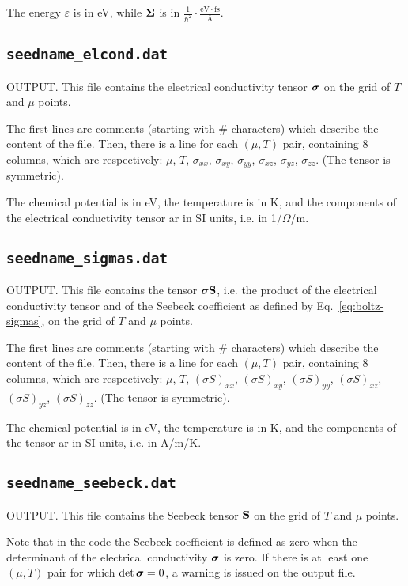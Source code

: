 The energy $\varepsilon$ is in eV, while $\bm{\mathrm{\Sigma}}$ is in 
 $\displaystyle\frac{1}{\hbar^2}\cdot\frac{\mathrm{eV}\cdot\mathrm{fs}}{\text{\AA}}$.

\subsection{{\tt seedname\_elcond.dat}}
OUTPUT. This file contains the electrical conductivity tensor $\bm{\mathrm{\sigma}}$ on the grid of $T$ and $\mu$ points. 

The first lines are comments (starting with \# characters) which describe the content of the file.
Then, there is a line for each $(\mu,T)$ pair, containing 8 columns, which are respectively: $\mu$, $T$, $\sigma_{xx}$, $\sigma_{xy}$, $\sigma_{yy}$, $\sigma_{xz}$, $\sigma_{yz}$, $\sigma_{zz}$. (The tensor is symmetric).

The chemical potential is in eV, the temperature is in K, and the components of the electrical conductivity tensor ar in SI units, i.e. in 1/$\Omega$/m.

\subsection{{\tt seedname\_sigmas.dat}}
OUTPUT. This file contains the tensor $\bm{\mathrm{\sigma}}\bm{\mathrm{S}}$, i.e. the product of the electrical conductivity tensor and of the Seebeck coefficient as defined by Eq.~\eqref{eq:boltz-sigmas}, on the grid of $T$ and $\mu$ points. 

The first lines are comments (starting with \# characters) which describe the content of the file.
Then, there is a line for each $(\mu,T)$ pair, containing 8 columns, which are respectively: $\mu$, $T$, $(\sigma S)_{xx}$, $(\sigma S)_{xy}$, $(\sigma S)_{yy}$, $(\sigma S)_{xz}$, $(\sigma S)_{yz}$, $(\sigma S)_{zz}$. (The tensor is symmetric).

The chemical potential is in eV, the temperature is in K, and the components of the tensor ar in SI units, i.e. in A/m/K.

\subsection{{\tt seedname\_seebeck.dat}}
OUTPUT. This file contains the Seebeck tensor $\bm{\mathrm{S}}$ on the grid of $T$ and $\mu$ points. 

Note that in the code the Seebeck coefficient is defined as zero when the determinant of the electrical conductivity $\bm{\mathrm{\sigma}}$ is zero. If there is at least one $(\mu, T)$ pair for which $\det \bm{\mathrm{\sigma}}=0$, a warning is issued on the output file.

